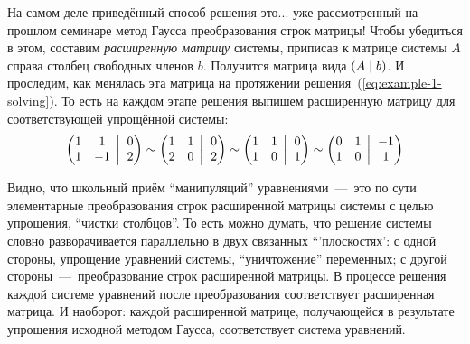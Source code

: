 \documentclass[a4paper,12pt]{article}
\newcommand{\BigMiddleTwo}{\;\left|\vphantom{\begin{pmatrix} 0\\0 \end{pmatrix}}\right.\;}
\begin{document}
  На самом деле приведённый способ решения это... уже рассмотренный на прошлом семинаре метод Гаусса преобразования строк матрицы!
  Чтобы убедиться в этом, составим \emph{расширенную матрицу} системы, приписав к матрице системы $A$ справа столбец свободных членов $b$.
  Получится матрица вида $(A \hm\mid b)$.
  И проследим, как менялась эта матрица на протяжении решения~(\ref{eq:example-1-solving}).
  То есть на каждом этапе решения выпишем расширенную матрицу для соответствующей упрощённой системы:
  \begin{equation}\label{eq:example-1-matrix-simplification}
    \left(
      \begin{matrix}
        1 & 1\\
        1 & -1
      \end{matrix}
      \BigMiddleTwo
      \begin{matrix}
        0\\
        2
      \end{matrix}
    \right)
    \sim\left(
      \begin{matrix}
        1 & 1\\
        2 & 0
      \end{matrix}
      \BigMiddleTwo
      \begin{matrix}
        0\\
        2
      \end{matrix}
    \right)
    \sim\left(
      \begin{matrix}
        1 & 1\\
        1 & 0
      \end{matrix}
      \BigMiddleTwo
      \begin{matrix}
        0\\
        1
      \end{matrix}
    \right)
    \sim\left(
      \begin{matrix}
        0 & 1\\
        1 & 0
      \end{matrix}
      \BigMiddleTwo
      \begin{matrix}
        -1\\
        1
      \end{matrix}
    \right)
  \end{equation}

  Видно, что школьный приём ``манипуляций'' уравнениями~---~это по сути элементарные преобразования строк расширенной матрицы системы с целью упрощения, ``чистки столбцов''.
  То есть можно думать, что решение системы словно разворачивается параллельно в двух связанных ``'плоскостях': с одной стороны, упрощение уравнений системы, ``уничтожение'' переменных; с другой стороны~---~преобразование строк расширенной матрицы.
  В процессе решения каждой системе уравнений после преобразования соответствует расширенная матрица.
  И наоборот: каждой расширенной матрице, получающейся в результате упрощения исходной методом Гаусса, соответствует система уравнений.
\end{document}
